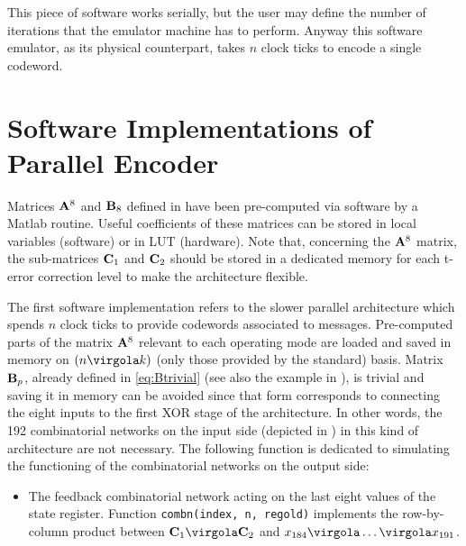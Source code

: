 
This piece of software works serially, but the user may define the number of iterations that the emulator machine has to perform. Anyway this software emulator, as its physical counterpart, takes \(n\) clock ticks to encode a single codeword.

\section{Software Implementations of Parallel Encoder}

Matrices \(\mathbf{A}^8\) and \(\mathbf{B}_8\) defined in  have been pre-computed via software by a Matlab routine. Useful coefficients of these matrices can be stored in local variables (software) or in LUT (hardware). Note that, concerning the \(\mathbf{A}^8\) matrix, the sub-matrices \(\mathbf{C}_1\) and \(\mathbf{C}_2\) should be stored in a dedicated memory for each t-error correction level to make the architecture flexible.

The first software implementation refers to the slower parallel architecture which spends \(n\) clock ticks to provide codewords associated to messages. Pre-computed parts of the matrix \(\mathbf{A}^8\) relevant to each operating mode are loaded and saved in memory on \( (n \virgola k) \) (only those provided by the standard) basis. Matrix \(\mathbf{B}_p\), already defined in \eqref{eq:Btrivial} (see also the example in ), is trivial and saving it in memory can be avoided since that form corresponds to connecting the eight inputs to the first XOR stage of the architecture. In other words, the 192 combinatorial networks on the input side (depicted in ) in this kind of architecture are not necessary.
The following function is dedicated to simulating the functioning of the combinatorial networks on the output side:
\begin{itemize}
\item The feedback combinatorial network acting on the last eight values of the state register. Function \texttt{combn(index, n, regold)} implements the row-by-column product between \(\vet C_1 \virgola \vet C_2\) and \(x_{184}\virgola \ldots \virgola x_{191}\).
\end{itemize}

